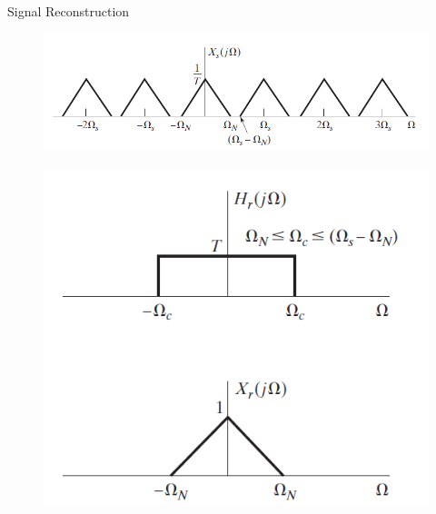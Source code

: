 \begin{frame}{Signal Reconstruction}
    \begin{figure}
        \centering
        \includegraphics[width=0.7\linewidth]{img/reconstruction.png}
        \label{fig:block_pcm}
    \end{figure}
\begin{figure}
        \centering
        \includegraphics[width=.3\linewidth]{img/reconstruction_2.png}
        \label{fig:a-law}
    \end{figure}
\end{frame}

